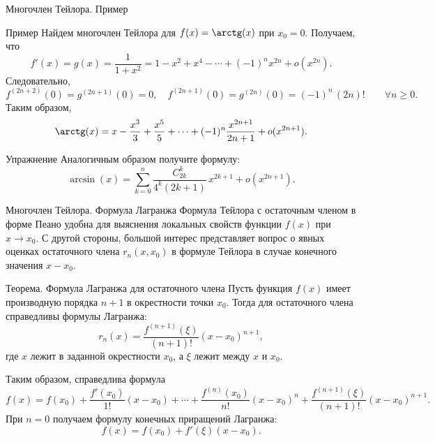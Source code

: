 \documentclass[8pt]{beamer}
\begin{document}
\begin{frame}{Многочлен Тейлора. Пример}
\begin{block}{Пример}
Найдем многочлен Тейлора для $f(x) = \arctg(x)$ при $x_0=0$. Получаем, что
$$f'(x) =g(x) =\frac{1}{1+x^2} = 1-x^2+x^4-\cdots+(-1)^n x^{2n}+o(x^{2n}).$$
Следовательно,
$$f^{(2n+2)}(0) = g^{(2n+1)}(0) = 0,\quad f^{(2n+1)}(0) = g^{(2n)}(0) = (-1)^n\, (2n)!\qquad \forall n\ge0.$$
Таким образом,
$$\arctg(x) =x-\frac{x^3}{3}+\frac{x^5}{5}+\cdots+(-1)^n\frac{x^{2n+1}}{2n+1}+o(x^{2n+1}).
$$
\end{block}
\begin{block}{Упражнение}
Аналогичным образом получите формулу:
$$\arcsin(x) = \sum_{k=0}^n  \frac{C_{2k}^k}{4^{k} (2k+1)}\, x^{2k+1}+o(x^{2n+1}).$$
\end{block}
\end{frame}


\begin{frame}{Многочлен Тейлора. Формула Лагранжа}
Формула Тейлора с остаточным членом в форме Пеано удобна для выяснения локальных свойств функции $f(x)$ при $x\to x_0$. С другой стороны, большой интерес представляет вопрос о явных оценках остаточного члена $r_n(x,x_0)$ в формуле Тейлора в случае конечного значения $x-x_0$.

\begin{block}{Теорема. Формула Лагранжа для остаточного члена}
Пусть функция $f(x)$ имеет производную порядка $n+1$ в окрестности точки $x_0$. Тогда для остаточного члена справедливы формулы Лагранжа:
$$r_n(x) = \frac{f^{(n+1)}(\xi)}{(n+1)!}(x-x_0)^{n+1},$$
где $x$ лежит в заданной окрестности $x_0$, а $\xi$ лежит между $x$ и $x_0$.  
\end{block}
Таким образом, справедлива формула
$$f(x) = f(x_0)+\frac{f'(x_0)}{1!}(x-x_0)+\cdots+\frac{f^{(n)}(x_0)}{n!}(x-x_0)^n+\frac{f^{(n+1)}(\xi)}{(n+1)!}(x-x_0)^{n+1}.$$
При $n=0$ получаем формулу конечных приращений Лагранжа:
$$f(x) = f(x_0) + f'(\xi)(x-x_0).$$
\end{frame}
\end{document}
